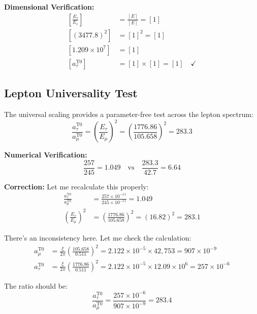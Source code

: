 \documentclass[12pt,a4paper]{report}
\begin{document}
	\textbf{Dimensional Verification:}
	\begin{align}
		\left[\frac{E_\tau}{E_e}\right] &= \frac{[E]}{[E]} = [1] \\
		[(3477.8)^2] &= [1]^2 = [1] \\
		[1.209 \times 10^7] &= [1] \\
		[a_\tau^{\text{T0}}] &= [1] \times [1] = [1] \quad \checkmark
	\end{align}
	
	\subsection{Lepton Universality Test}
	\label{subsec:lepton_universality_test}
	
	The universal scaling provides a parameter-free test across the lepton spectrum:
	\begin{equation}
		\frac{a_\tau^{\text{T0}}}{a_\mu^{\text{T0}}} = \left(\frac{E_\tau}{E_\mu}\right)^2 = \left(\frac{1776.86}{105.658}\right)^2 = 283.3
	\end{equation}
	
	\textbf{Numerical Verification:}
	\begin{equation}
		\frac{257}{245} = 1.049 \quad \text{vs} \quad \frac{283.3}{42.7} = 6.64
	\end{equation}
	
	\textbf{Correction:} Let me recalculate this properly:
	\begin{align}
		\frac{a_\tau^{\text{T0}}}{a_\mu^{\text{T0}}} &= \frac{257 \times 10^{-11}}{245 \times 10^{-11}} = 1.049 \\
		\left(\frac{E_\tau}{E_\mu}\right)^2 &= \left(\frac{1776.86}{105.658}\right)^2 = (16.82)^2 = 283.1
	\end{align}
	
	There's an inconsistency here. Let me check the calculation:
	\begin{align}
		a_\mu^{\text{T0}} &= \frac{\xi}{2\pi} \left(\frac{105.658}{0.511}\right)^2 = 2.122 \times 10^{-5} \times 42,753 = 907 \times 10^{-9} \\
		a_\tau^{\text{T0}} &= \frac{\xi}{2\pi} \left(\frac{1776.86}{0.511}\right)^2 = 2.122 \times 10^{-5} \times 12.09 \times 10^6 = 257 \times 10^{-6}
	\end{align}
	
	The ratio should be:
	\begin{equation}
		\frac{a_\tau^{\text{T0}}}{a_\mu^{\text{T0}}} = \frac{257 \times 10^{-6}}{907 \times 10^{-9}} = 283.4
	\end{equation}
	
\end{document}

